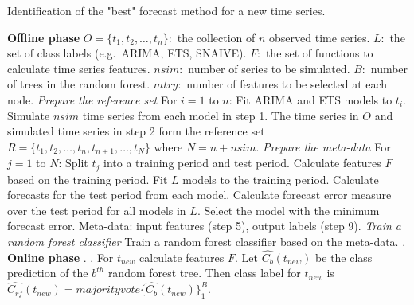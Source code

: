 \documentclass[11pt,a4paper,]{article}
\theoremstyle{definition}
\theoremstyle{definition}
\theoremstyle{definition}
\theoremstyle{remark}
\begin{document}
\begin{algorithm}[!hb]
  \caption{Identification of the "best" forecast method for a new time series.}
  \label{alg:algo-lab}
  \begin{algorithmic}[1]
    \Statex \textbf{Offline phase}
    \Statex {}
    \Statex \hspace{1cm}$O=\{t_1, t_2, \dots,t_n\}:$ the collection of $n$ observed time series.
      \Statex \hspace{1cm}$L:$ the set of class labels (e.g.\ ARIMA, ETS, SNAIVE).
         \Statex \hspace{1cm}$F:$ the set of functions to calculate time series features.
         \Statex \hspace{1cm}$nsim:$ number of series to be simulated.
         \Statex \hspace{1cm}$B:$ number of trees in the random forest.
         \Statex \hspace{1cm}$mtry:$ number of features to be selected at each node.
     \Statex {}
      \Statex \hspace{1cm} 
      \Statex
     \Statex \textit{Prepare the reference set}
    \Statex For $i=1$ to $n$:
            \State Fit ARIMA and ETS models to $t_i$.
            \State Simulate $nsim$ time series from each model in step 1.
            \State The time series in $O$ and simulated time series in step 2 form the reference set $R=\{t_1, t_2, \dots,t_n, t_{n+1},\dots,t_N\}$ where $N = n + nsim$.
    \Statex 
    \Statex \textit{Prepare the meta-data}
    \Statex For $j=1$ to $N$:
            \State Split $t_j$ into a training period and test period.
            \State Calculate features $F$ based on the training period. 
            \State Fit $L$ models to the training period.
            \State Calculate forecasts for the test period from each model.
            \State Calculate forecast error measure over the test period for all models in $L$.
            \State Select the model with the minimum forecast error.
            \State Meta-data: input features (step 5), output labels (step 9).
     \Statex
    \Statex \textit{Train a random forest classifier}
            \State Train a random forest classifier based on the meta-data.
            . 
    \Statex
     \Statex \textbf{Online phase}
    \Statex {}
    \Statex \hspace{1cm} .
     \Statex {}
      \Statex \hspace{1cm}.
  \State For $t_{new}$ calculate features $F$.
  \State Let $\hat{C_b}(t_{new})$ be the class prediction of the $b^{th}$ random forest tree. Then class label for $t_{new}$ is $\hat{C_{rf}}(t_{new})=majorityvote\{\hat{C_b}(t_{new})\}_1^B$.
   \end{algorithmic}
\end{algorithm}
\end{document}

